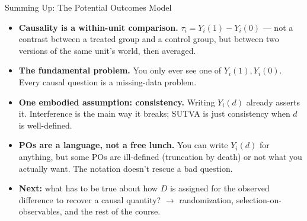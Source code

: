 \documentclass[xcolor=dvipsnames]{beamer}
\newcommand\E{\mathbb{E}}
\begin{document}

\begin{frame}{Summing Up: The Potential Outcomes Model}
\footnotesize
\begin{itemize}
\item<1-> \textbf{Causality is a within-unit comparison.} $\tau_i = Y_i(1)-Y_i(0)$ --- not a contrast between a treated group and a control group, but between two versions of the same unit's world, then averaged.
\medskip
\item<2-> \textbf{The fundamental problem.} You only ever see one of $Y_i(1), Y_i(0)$. Every causal question is a missing-data problem.
\medskip
\item<3-> \textbf{One embodied assumption: consistency.} Writing $Y_i(d)$ already asserts it. Interference is the main way it breaks; SUTVA is just consistency when $d$ is well-defined.
\medskip
\item<4-> \textbf{POs are a language, not a free lunch.} You can write $Y_i(d)$ for anything, but some POs are ill-defined (truncation by death) or not what you actually want. The notation doesn't rescue a bad question.
\medskip
\item<5-> \textbf{Next:} what has to be true about how $D$ is assigned for the observed difference to recover a causal quantity? $\rightarrow$ randomization, selection-on-observables, and the rest of the course.
\end{itemize}
\end{frame}
\end{document}
